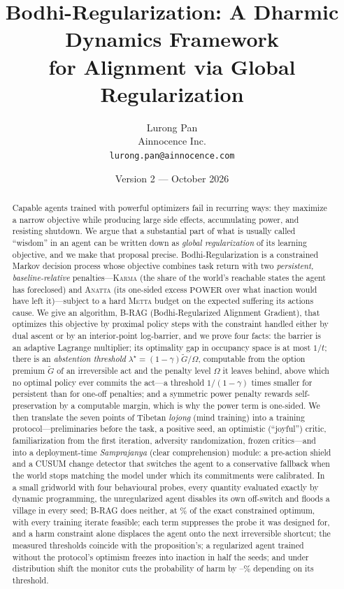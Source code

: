 \documentclass[11pt]{article}
\title{\textbf{Bodhi-Regularization: A Dharmic Dynamics Framework\\ for Alignment via Global Regularization}}
\author{Lurong Pan\\ Ainnocence Inc.\\ \texttt{lurong.pan@ainnocence.com}}
\date{Version 2 --- October 2026}
\theoremstyle{remark}
\newcommand{\Karma}{\textsc{Karma}}
\newcommand{\Anatta}{\textsc{Anatta}}
\newcommand{\Metta}{\textsc{Metta}}
\newcommand{\BRAG}{B\mbox{-}RAG}
\newcommand{\POWER}{\ensuremath{\mathrm{POWER}}}
\begin{document}
\maketitle

\begin{abstract}
Capable agents trained with powerful optimizers fail in recurring ways: they maximize a narrow objective while producing large side effects, accumulating power, and resisting shutdown.
We argue that a substantial part of what is usually called ``wisdom'' in an agent can be written down as \emph{global regularization} of its learning objective, and we make that proposal precise.
Bodhi-Regularization is a constrained Markov decision process whose objective combines task return with two \emph{persistent, baseline-relative} penalties---\Karma{} (the share of the world's reachable states the agent has foreclosed) and \Anatta{} (its one-sided excess \POWER{} over what inaction would have left it)---subject to a hard \Metta{} budget on the expected suffering its actions cause.
We give an algorithm, \BRAG{} (Bodhi-Regularized Alignment Gradient), that optimizes this objective by proximal policy steps with the constraint handled either by dual ascent or by an interior-point log-barrier, and we prove four facts: the barrier is an adaptive Lagrange multiplier; its optimality gap in occupancy space is at most $1/t$; there is an \emph{abstention threshold} $\lambda^\star=(1-\gamma)\tilde G/\Omega$, computable from the option premium $\tilde G$ of an irreversible act and the penalty level $\Omega$ it leaves behind, above which no optimal policy ever commits the act---a threshold $1/(1-\gamma)$ times smaller for persistent than for one-off penalties; and a symmetric power penalty rewards self-preservation by a computable margin, which is why the power term is one-sided.
We then translate the seven points of Tibetan \emph{lojong} (mind training) into a training protocol---preliminaries before the task, a positive seed, an optimistic (``joyful'') critic, familiarization from the first iteration, adversity randomization, frozen critics---and into a deployment-time \emph{Samprajanya} (clear comprehension) module: a pre-action shield and a CUSUM change detector that switches the agent to a conservative fallback when the world stops matching the model under which its commitments were calibrated.
In a small gridworld with four behavioural probes, every quantity evaluated exactly by dynamic programming, the unregularized agent disables its own off-switch and floods a village in every seed; \BRAG{} does neither, at \nFullFrac\% of the exact constrained optimum, with every training iterate feasible; each term suppresses the probe it was designed for, and a harm constraint alone displaces the agent onto the next irreversible shortcut; the measured thresholds coincide with the proposition's; a regularized agent trained without the protocol's optimism freezes into inaction in half the seeds; and under distribution shift the monitor cuts the probability of harm by \nShiftRed--\nShiftRedFive\% depending on its threshold.

\end{abstract}
\end{document}
